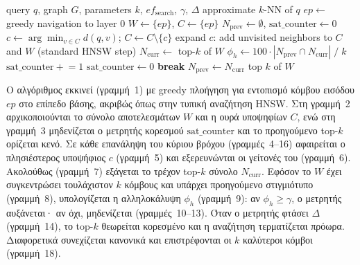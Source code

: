 \documentclass[12pt,a4paper]{article}
\begin{document}
\begin{algorithm}[H]
\caption{PiP: Patience in Proximity Search}
\label{alg:pip}
\begin{algorithmic}[1]
\Require query $q$, graph $G$, parameters $k$, $ef_{\text{search}}$, $\gamma$, $\Delta$
\Ensure approximate $k$-NN of $q$
\State $ep \leftarrow$ greedy navigation to layer 0
\State $W \leftarrow \{ep\}$, $C \leftarrow \{ep\}$
\State $N_{\text{prev}} \leftarrow \emptyset$, $\text{sat\_counter} \leftarrow 0$
    \State $c \leftarrow \arg\min_{v \in C} d(q, v)$; $C \leftarrow C \setminus \{c\}$
    \State expand $c$: add unvisited neighbors to $C$ and $W$ (standard HNSW step)
    \State $N_{\text{curr}} \leftarrow $ top-$k$ of $W$
        \State $\phi_h \leftarrow 100 \cdot |N_{\text{prev}} \cap N_{\text{curr}}| \;/\; k$
            \State $\text{sat\_counter} \mathrel{+}= 1$
        \Else
            \State $\text{sat\_counter} \leftarrow 0$
        \EndIf
            \State \textbf{break} 
        \EndIf
    \EndIf
    \State $N_{\text{prev}} \leftarrow N_{\text{curr}}$
\EndWhile
\State \Return top $k$ of $W$
\end{algorithmic}
\end{algorithm}

Ο αλγόριθμος εκκινεί (γραμμή~1) με greedy πλοήγηση για εντοπισμό κόμβου εισόδου $ep$ στο επίπεδο βάσης, ακριβώς όπως στην τυπική αναζήτηση HNSW. Στη γραμμή~2 αρχικοποιούνται το σύνολο αποτελεσμάτων $W$ και η ουρά υποψηφίων $C$, ενώ στη γραμμή~3 μηδενίζεται ο μετρητής κορεσμού $\text{sat\_counter}$ και το προηγούμενο top-$k$ ορίζεται κενό. Σε κάθε επανάληψη του κύριου βρόχου (γραμμές~4--16) αφαιρείται ο πλησιέστερος υποψήφιος $c$ (γραμμή~5) και εξερευνώνται οι γείτονές του (γραμμή~6). Ακολούθως (γραμμή~7) εξάγεται το τρέχον top-$k$ σύνολο $N_{\text{curr}}$. Εφόσον το $W$ έχει συγκεντρώσει τουλάχιστον $k$ κόμβους και υπάρχει προηγούμενο στιγμιότυπο (γραμμή~8), υπολογίζεται η αλληλοκάλυψη $\phi_h$ (γραμμή~9): αν $\phi_h \geq \gamma$, ο μετρητής αυξάνεται· αν όχι, μηδενίζεται (γραμμές~10--13). Όταν ο μετρητής φτάσει $\Delta$ (γραμμή~14), το top-$k$ θεωρείται κορεσμένο και η αναζήτηση τερματίζεται πρόωρα. Διαφορετικά συνεχίζεται κανονικά και επιστρέφονται οι $k$ καλύτεροι κόμβοι (γραμμή~18).
\end{document}

